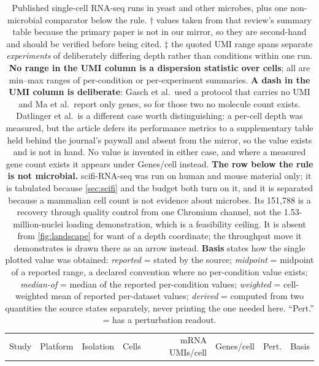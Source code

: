\begin{table}[htbp]\centering
\scriptsize
\caption[]{Published single-cell RNA-seq runs in yeast and other microbes, plus one non-microbial comparator below the rule. $\dagger$ values taken from that review's summary table because the primary paper is not in our mirror, so they are second-hand and should be verified before being cited. $\ddagger$ the quoted UMI range spans separate \emph{experiments} of deliberately differing depth rather than conditions within one run. \textbf{No range in the UMI column is a dispersion statistic over cells}; all are min--max ranges of per-condition or per-experiment summaries. \textbf{A dash in the UMI column is deliberate}: Gasch et al.\ used a protocol that carries no UMI and Ma et al.\ report only genes, so for those two no molecule count exists. Datlinger et al.\ is a different case worth distinguishing: a per-cell depth was measured, but the article defers its performance metrics to a supplementary table held behind the journal's paywall and absent from the mirror, so the value exists and is not in hand. No value is invented in either case, and where a measured gene count exists it appears under Genes/cell instead. \textbf{The row below the rule is not microbial.} scifi-RNA-seq was run on human and mouse material only; it is tabulated because \cref{sec:scifi} and the budget both turn on it, and it is separated because a mammalian cell count is not evidence about microbes. Its 151{,}788 is a recovery through quality control from one Chromium channel, not the 1.53-million-nuclei loading demonstration, which is a feasibility ceiling. It is absent from \cref{fig:landscape} for want of a depth coordinate; the throughput move it demonstrates is drawn there as an arrow instead. \textbf{Basis} states how the single plotted value was obtained: \emph{reported} = stated by the source; \emph{midpoint} = midpoint of a reported range, a declared convention where no per-condition value exists; \emph{median-of} = median of the reported per-condition values; \emph{weighted} = cell-weighted mean of reported per-dataset values; \emph{derived} = computed from two quantities the source states separately, never printing the one needed here. ``Pert.'' = has a perturbation readout.}\label{tab:landscape}
\begin{tabular}{lllrrrcl}
\toprule
Study & Platform & Isolation & Cells & mRNA UMIs/cell & Genes/cell & Pert. & Basis \\

\end{tabular}
\end{table}
